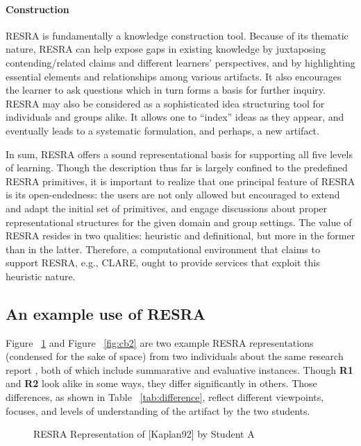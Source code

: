 \paragraph{Construction}

RESRA is fundamentally a knowledge construction tool. Because of its
thematic nature, RESRA can help expose gaps in existing knowledge by juxtaposing
contending/related claims and different learners' perspectives, and by
highlighting essential elements and relationships among various artifacts.
It also encourages the learner to ask questions which in turn forms a basis
for further inquiry. RESRA may also be considered as a sophisticated idea
structuring tool for individuals and groups alike. It allows one to
``index'' ideas as they appear, and eventually leads to a systematic
formulation, and perhaps, a new artifact. 

In sum, RESRA offers a sound representational basis for supporting all five
levels of learning. Though the description thus far is largely confined to
the predefined RESRA primitives, it is important to realize that one
principal feature of RESRA is its open-endedness: the users are not only
allowed but encouraged to extend and adapt the initial set of primitives,
and engage discussions about proper representational structures for the
given domain and group settings. The value of RESRA resides in two
qualities: heuristic and definitional, but more in the former than in the
latter.  Therefore, a computational environment that claims to support
RESRA, e.g., CLARE, ought to provide services that exploit this heuristic
nature.


\subsection{An example use of RESRA}
\label{sec:resra-example}

Figure ~\ref{fig:cb1} and Figure ~\ref{fig:cb2} are two example RESRA
representations (condensed for the sake of space) from two individuals
about the same research report \cite{Kaplan92}, both of which include
summarative and evaluative instances. Though {\bf R1} and {\bf R2} look
alike in some ways, they differ significantly in others. Those differences,
as shown in Table ~\ref{tab:difference}, reflect different viewpoints,
focuses, and levels of understanding of the artifact by the two students.

\begin{figure}[htb]
  \caption{RESRA Representation of [Kaplan92] by Student A}
  \label{fig:cb1}
\end{figure}

